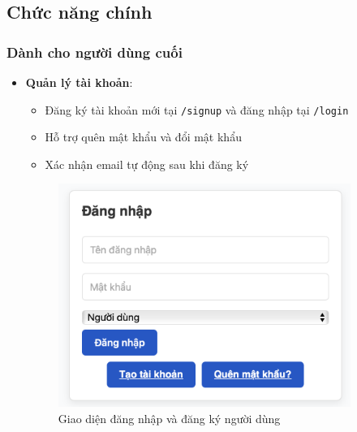 \documentclass[12pt,a4paper]{article}
\begin{document}
\subsection{Chức năng chính}

\subsubsection{Dành cho người dùng cuối}
\begin{itemize}[leftmargin=1cm]
    \item \textbf{Quản lý tài khoản}:
        \begin{itemize}[leftmargin=0.5cm]
            \item Đăng ký tài khoản mới tại \texttt{/signup} và đăng nhập tại \texttt{/login}
            \item Hỗ trợ quên mật khẩu và đổi mật khẩu
            \item Xác nhận email tự động sau khi đăng ký
        \end{itemize}
\begin{figure}[H]
    \centering
    \includegraphics[width=0.9\textwidth]{../figures/ui_user_dang_nhap_dang_ky.png} %
    \caption{Giao diện đăng nhập và đăng ký người dùng}
    \label{fig:ui_user_login_signup}
\end{figure}


\end{itemize}
\end{document}
